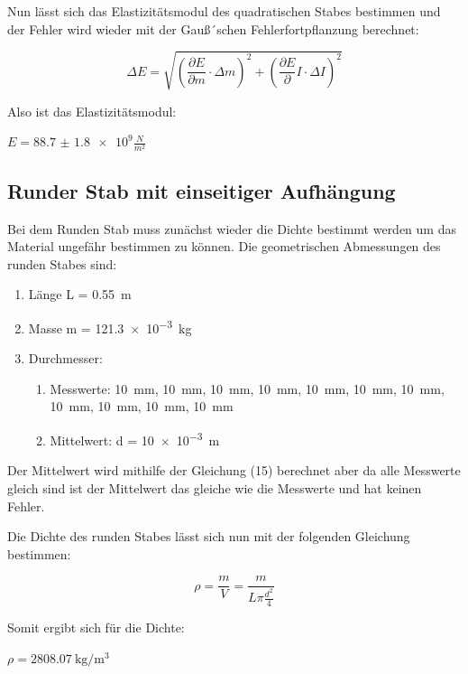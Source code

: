 Nun lässt sich das Elastizitätsmodul des quadratischen Stabes bestimmen und der Fehler
wird wieder mit der Gauß´schen Fehlerfortpflanzung berechnet:

\begin{equation}
  \Delta E = \sqrt{\left(\frac{\partial E}{\partial m} \cdot \Delta m \right)^2 +
  \left( \frac{\partial E}{\partial} I \cdot \Delta I \right)^2}
\end{equation}

Also ist das Elastizitätsmodul: \\
\centerline{$E = \num{88.7(18)e9} \frac{N}{m^2}$}

\subsection{Runder Stab mit einseitiger Aufhängung}

Bei dem Runden Stab muss zunächst wieder die Dichte bestimmt werden um das Material
ungefähr bestimmen zu können. Die geometrischen Abmessungen des runden Stabes sind:

\begin{enumerate}
  \item Länge L = \SI{0.55}{\meter}
  \item Masse m = \SI{121.3e-3}{\kilo\gram}
  \item Durchmesser:
  \begin{enumerate}
    \item Messwerte: \SI{10}{\milli\meter}, \SI{10}{\milli\meter}, \SI{10}{\milli\meter},
    \SI{10}{\milli\meter}, \SI{10}{\milli\meter}, \SI{10}{\milli\meter},
    \SI{10}{\milli\meter}, \SI{10}{\milli\meter}, \SI{10}{\milli\meter},
    \SI{10}{\milli\meter}, \SI{10}{\milli\meter}
    \item Mittelwert: d = \SI{10e-3}{\meter}
  \end{enumerate}
\end{enumerate}

Der Mittelwert wird mithilfe der Gleichung (15) berechnet aber da alle Messwerte gleich
sind ist der Mittelwert das gleiche wie die Messwerte und hat keinen Fehler.

Die Dichte des runden Stabes lässt sich nun mit der folgenden Gleichung bestimmen:

\begin{equation}
  \rho = \frac{m}{V} = \frac{m}{L \pi \frac{d^2}{4}}
\end{equation}

Somit ergibt sich für die Dichte:\\
\centerline{$\rho = \SI[per-mode=fraction]{2808.07}{\kilo\gram\per\meter
\tothe{3}}$}

